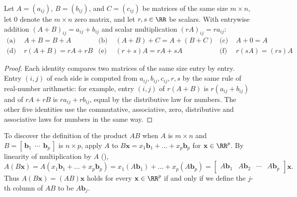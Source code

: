 \documentclass[10pt]{scrartcl}
\newcommand{\vv}[1]{\mathbf{#1}}
\begin{document}
\begin{theorem*}
  Let $A=(a_{ij})$, $B=(b_{ij})$, and $C=(c_{ij})$ be matrices of the same size $m\times n$, let $0$ denote the $m\times n$ zero matrix, and let $r,s\in\RR$ be scalars. With entrywise addition $(A+B)_{ij}=a_{ij}+b_{ij}$ and scalar multiplication $(rA)_{ij}=ra_{ij}$:
  \begin{align*}
    \text{(a) } & A + B = B + A &
    \text{(b) } & (A + B) + C = A + (B + C) &
    \text{(c) } & A + 0 = A \\
    \text{(d) } & r(A + B) = rA + rB &
    \text{(e) } & (r + s)A = rA + sA &
    \text{(f) } & r(sA) = (rs)A
  \end{align*}
\end{theorem*}
\begin{proof}
  Each identity compares two matrices of the same size entry by entry. Entry $(i,j)$ of each side is computed from $a_{ij},b_{ij},c_{ij},r,s$ by the same rule of real-number arithmetic: for example, entry $(i,j)$ of $r(A+B)$ is $r(a_{ij}+b_{ij})$ and of $rA+rB$ is $ra_{ij}+rb_{ij}$, equal by the distributive law for numbers. The other five identities use the commutative, associative, zero, distributive and associative laws for numbers in the same way.
\end{proof}

To discover the definition of the product $AB$ when $A$ is $m\times n$ and $B=[\,\vv b_1\ \ \cdots\ \ \vv b_p\,]$ is $n\times p$, apply $A$ to $B\vv x=x_1\vv b_1+\dots+x_p\vv b_p$ for $\vv x\in\RR^p$. By linearity of multiplication by $A$ (),
\[
  A(B\vv x) = A(x_1\vv b_1 + \dots + x_p\vv b_p) = x_1(A\vv b_1) + \dots + x_p(A\vv b_p) = \begin{bmatrix} A\vv b_1 & A\vv b_2 & \cdots & A\vv b_p \end{bmatrix}\vv x.
\]
Thus $A(B\vv x)=(AB)\vv x$ holds for every $\vv x\in\RR^p$ if and only if we define the $j$-th column of $AB$ to be $A\vv b_j$.
\end{document}
